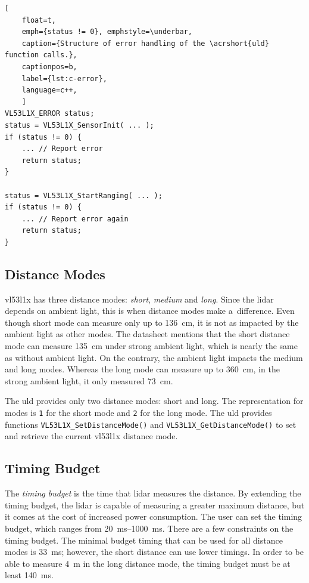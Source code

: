 \documentclass[
  digital,     %
  oneside,     %
  nosansbold,  %
  nocolorbold, %
  nolof,         %
  nolot,         %
]{fithesis4}
\begin{document}
\begin{lstlisting}[
    float=t,
    emph={status != 0}, emphstyle=\underbar,
    caption={Structure of error handling of the \acrshort{uld} function calls.},
    captionpos=b,
    label={lst:c-error},
    language=c++,
    ]
VL53L1X_ERROR status;
status = VL53L1X_SensorInit( ... );
if (status != 0) {
    ... // Report error
    return status;
}

status = VL53L1X_StartRanging( ... );
if (status != 0) {
    ... // Report error again
    return status;
}
\end{lstlisting}

\subsection{ Distance Modes } \label{sec:distance-modes}

\gls{vl53l1x} has three distance modes: \emph{short}, \emph{medium} and \emph{long}. Since the
\acrshort{lidar} depends on ambient light, this is when distance modes make a~difference. Even
though short mode can measure only up to \qty{136}{\centi\metre}, it is not as impacted by the
ambient light as other modes. The datasheet \cite{vl53l1x} mentions that the short distance mode can
measure \qty{135}{\centi\metre} under strong ambient light, which is nearly the same as without
ambient light. On the contrary, the ambient light impacts the medium and long modes. Whereas the
long mode can measure up to \qty{360}{\centi\metre}, in the strong ambient light, it only measured
\qty{73}{\centi\metre}.

The \acrshort{uld} provides only two distance modes: short and long. The representation for modes is
\lstinline|1| for the short mode and \lstinline|2| for the long mode. The \acrshort{uld} provides
functions \lstinline|VL53L1X_SetDistanceMode()| and \lstinline|VL53L1X_GetDistanceMode()| to set and
retrieve the current \gls{vl53l1x} distance mode.

\subsection{ Timing Budget } \label{TB}

The \emph{timing budget} is the time that \acrshort{lidar} measures the distance. By extending the
timing budget, the \acrshort{lidar} is capable of measuring a greater maximum distance, but it comes
at the cost of increased power consumption. The user can set the timing budget, which ranges from
\qtyrange{20}{1000}{\milli\second}. There are a few constraints on the timing budget. The minimal
budget timing that can be used for all distance modes is \qty{33}{\milli\second}; however, the short
distance can use lower timings. In order to be able to measure \qty{4}{\metre} in the long distance
mode, the timing budget must be at least \qty{140}{\milli\second}.
\end{document}
